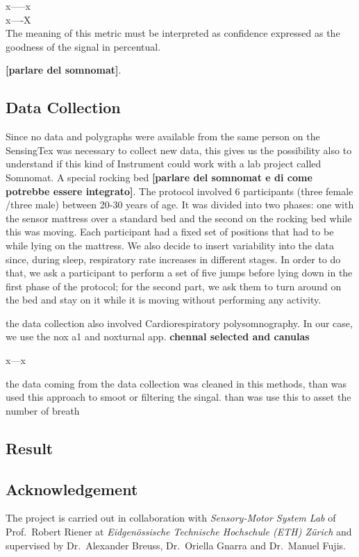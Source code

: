 \documentclass[a4paper,11pt, oneside,italian]{article}
\begin{document}
x-----x \\

x----X \\


The meaning of this metric must be interpreted as confidence expressed as the goodness of the signal in percentual.




\textbf{[parlare del somnomat]}.

\subsection*{Data Collection}
Since no data and polygraphs were available from the same person
on the SensingTex was necessary to collect new data, this gives 
us the possibility also to understand if this kind of Instrument
could work with a lab project called Somnomat. A special 
rocking bed \textbf{[parlare del somnomat e di come potrebbe essere integrato]}. The protocol involved 
6 participants (three female /three male) between 20-30 years of age. It was divided into two phases: one 
with the sensor mattress over a standard bed and the second on the rocking bed while this was moving. 
Each participant had a fixed set of positions that had to be while lying on the mattress. 
We also decide to insert variability into the data since, during sleep, respiratory rate increases in different stages. 
In order to do that, we ask a participant to perform a set of five jumps before lying down in the first 
phase of the protocol; for the second part, we ask them to turn around on the bed and stay on it 
while it is moving without performing any activity.


the data collection also involved Cardiorespiratory polysomnography. In our case, we use the nox a1 and noxturnal app. 
\textbf{chennal selected and canulas}

x---x

the data coming from the data collection was cleaned in this methods, than was used this approach to smoot or filtering the singal.
than was use this to asset the number of breath

\subsection*{Result}

\subsection*{Acknowledgement}
The project is carried out in collaboration with \textit{Sensory-Motor System Lab} of Prof.~Robert Riener at \textit{Eidgenössische Technische Hochschule 
(ETH) Zürich} and supervised by Dr.~Alexander Breuss, Dr.~Oriella Gnarra and Dr.~Manuel Fujis.
\end{document}
